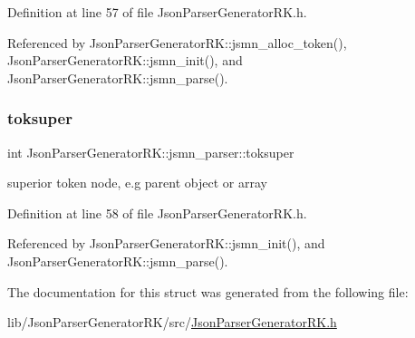 Definition at line 57 of file Json\+Parser\+Generator\+R\+K.\+h.



Referenced by Json\+Parser\+Generator\+R\+K\+::jsmn\+\_\+alloc\+\_\+token(), Json\+Parser\+Generator\+R\+K\+::jsmn\+\_\+init(), and Json\+Parser\+Generator\+R\+K\+::jsmn\+\_\+parse().

\mbox{\label{struct_json_parser_generator_r_k_1_1jsmn__parser_a5876016a03cc03cf6b9b24ad456a3d24}} 
\subsubsection{\texorpdfstring{toksuper}{toksuper}}
{\footnotesize\ttfamily int Json\+Parser\+Generator\+R\+K\+::jsmn\+\_\+parser\+::toksuper}



superior token node, e.\+g parent object or array 



Definition at line 58 of file Json\+Parser\+Generator\+R\+K.\+h.



Referenced by Json\+Parser\+Generator\+R\+K\+::jsmn\+\_\+init(), and Json\+Parser\+Generator\+R\+K\+::jsmn\+\_\+parse().



The documentation for this struct was generated from the following file\+:\begin{DoxyCompactItemize}
\item 
lib/\+Json\+Parser\+Generator\+R\+K/src/\hyperlink{_json_parser_generator_r_k_8h}{Json\+Parser\+Generator\+R\+K.\+h}\end{DoxyCompactItemize}

